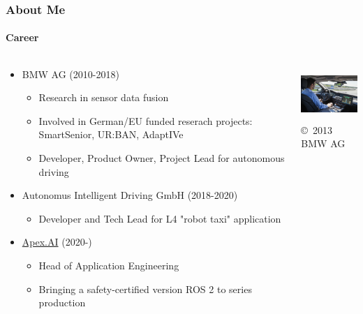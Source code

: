 \begin{frame}
\frametitle{About Me}
\framesubtitle{Career}
\begin{columns}[T]
    \begin{column}{.70\textwidth}
    \begin{itemize}
        \item BMW AG (2010-2018)
        \begin{itemize}
            \item Research in sensor data fusion
            \item Involved in German/EU funded reserach projects:
                SmartSenior, UR:BAN, AdaptIVe
            \item Developer, Product Owner, Project Lead for autonomous driving
        \end{itemize}
        \item Autonomus Intelligent Driving GmbH (2018-2020)
        \begin{itemize}
            \item Developer and Tech Lead for L4 "robot taxi" application
        \end{itemize}
        \item \href{https://www.apex.ai/}{Apex.AI} (2020-)
        \begin{itemize}
            \item Head of Application Engineering
            \item Bringing a safety-certified version ROS 2 to series production
        \end{itemize}
    \end{itemize}
    \end{column}
    \begin{column}{.30\textwidth}
    \centering
    \includegraphics[height=2.0cm]{images/michael-aeberhard-bmw.jpg} \\
    \tiny \copyright \, 2013 BMW AG
    \end{column}
\end{columns}
\end{frame}